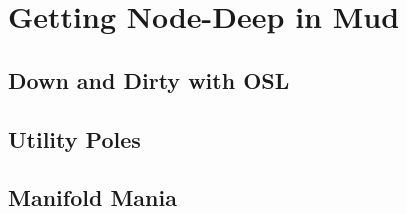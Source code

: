 \chapter{Getting Node-Deep in Mud}  %
\section{Down and Dirty with OSL}
\section{Utility Poles}
\section{Manifold Mania}